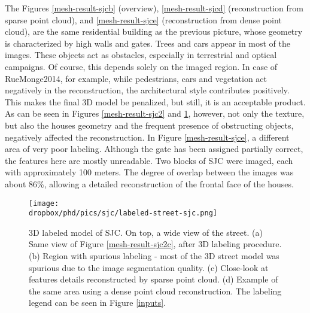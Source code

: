 The Figures \ref{mesh-result-sjcb} (overview), \ref{mesh-result-sjcd} (reconstruction from sparse point cloud), and \ref{mesh-result-sjce} (reconstruction from dense point cloud), are the same residential building as the previous picture, whose geometry is characterized by high walls and gates. Trees and cars appear in most of the images. These objects act as obstacles, especially in terrestrial and optical campaigns. Of course, this depends solely on the imaged region. In case of RueMonge2014, for example, while pedestrians, cars and vegetation act negatively in the reconstruction, the architectural style contributes positively. This makes the final 3D model be penalized, but still, it is an acceptable product. As can be seen in Figures \ref{mesh-result-sjc2} and \ref{mesh-result-sjc}, however, not only the texture, but also the houses geometry and the frequent presence of obstructing objects, negatively affected the reconstruction. In Figure \ref{mesh-result-sjce}, a different area of very poor labeling. Although the gate has been assigned partially correct, the features here are mostly unreadable. Two blocks of SJC were imaged, each with approximately 100 meters. The degree of overlap between the images was about 86\%, allowing a detailed reconstruction of the frontal face of the houses.
\begin{figure}[H]
    \centering   
    \caption{3D labeled model of SJC. On top, a wide view of the street. (a) Same view of Figure \ref{mesh-result-sjc2c}, after 3D labeling procedure. (b) Region with spurious labeling - most of the 3D street model was spurious due to the image segmentation quality. (c) Close-look at features details reconstructed by sparse point cloud. (d) Example of the same area using a dense point cloud reconstruction. The labeling legend can be seen in Figure \ref{inputs}.}
    \vspace{6mm}
    \label{mesh-result-sjca}\texttt{[image: \\dropbox/phd/pics/sjc/labeled-street-sjc.png]}
    \legenda{}
    \label{mesh-result-sjc}
\end{figure}

